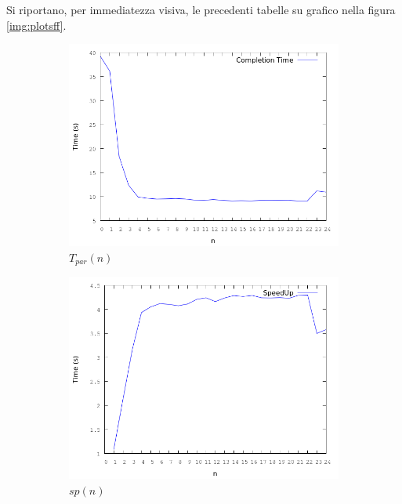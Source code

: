 \documentclass[12pt]{article}
\begin{document}
Si riportano, per immediatezza visiva, le precedenti tabelle su grafico nella figura \ref{img:plotsff}.
\begin{figure}[!htbp]
\begin{subfigure}{.55\textwidth}
  \centering
  \includegraphics[scale=.35,keepaspectratio]{ff_tc.png}
  \caption{$T_{par}(n)$}
  \label{fig:tisc}
\end{subfigure} 
\begin{subfigure}{.55\textwidth}
  \centering
  \includegraphics[scale=.35,keepaspectratio]{ff_sp.png}
  \caption{$sp(n)$}
  \label{fig:ftsec}
\end{subfigure}
\begin{subfigure}{.55\textwidth}
  \centering

\end{subfigure}
\end{figure}
\end{document}
